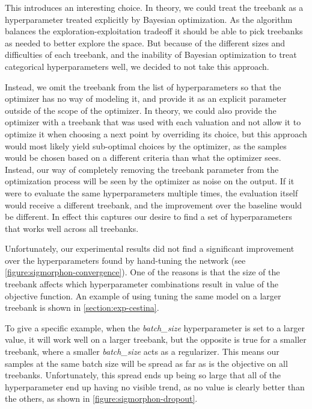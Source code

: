 This introduces an interesting choice. In theory, we could treat the treebank as a hyperparameter treated explicitly by Bayesian optimization. As the algorithm balances the exploration-exploitation tradeoff it should be able to pick treebanks as needed to better explore the space. But because of the different sizes and difficulties of each treebank, and the inability of Bayesian optimization to treat categorical hyperparameters well, we decided to not take this approach.

Instead, we omit the treebank from the list of hyperparameters so that the optimizer has no way of modeling it, and provide it as an explicit parameter outside of the scope of the optimizer. In theory, we could also provide the optimizer with a treebank that was used with each valuation and not allow it to optimize it when choosing a next point by overriding its choice, but this approach would most likely yield sub-optimal choices by the optimizer, as the samples would be chosen based on a different criteria than what the optimizer sees. Instead, our way of completely removing the treebank parameter from the optimization process will be seen by the optimizer as noise on the output. If it were to evaluate the same hyperparameters multiple times, the evaluation itself would receive a different treebank, and the improvement over the baseline would be different. In effect this captures our desire to find a set of hyperparameters that works well across all treebanks.

Unfortunately, our experimental results did not find a significant improvement over the hyperparameters found by hand-tuning the network (see \autoref{figure:sigmorphon-convergence}). One of the reasons is that the size of the treebank affects which hyperparameter combinations result in value of the objective function. An example of using tuning the same model on a larger treebank is shown in \autoref{section:exp-cestina}.

To give a specific example, when the \emph{batch\_size} hyperparameter is set to a larger value, it will work well on a larger treebank, but the opposite is true for a smaller treebank, where a smaller \emph{batch\_size} acts as a regularizer. This means our samples at the same batch size will be spread as far as is the objective on all treebanks. Unfortunately, this spread ends up being so large that all of the hyperparameter end up having no visible trend, as no value is clearly better than the others, as shown in \autoref{figure:sigmorphon-dropout}.

